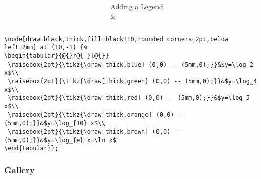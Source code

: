 \documentclass[aspectratio=169,mathserif,8pt,xcolor=table,notes=show]{beamer}
\begin{document}
\begin{frame}[fragile]
\begin{columns}[T]
\begin{column}{.433\textwidth}
				\end{column}
				\begin{column}{.433\textwidth}
					\centering
						\quad\\[.5in]
						{\Huge Adding a Legend}\\[.2in]
						\&\\[.2in]
						\href{http://www.texample.net/tikz/examples/}{}
				\end{column}
			\end{columns}
			\begin{lstlisting}
\node[draw=black,thick,fill=black!10,rounded corners=2pt,below left=2mm] at (10,-1) {%
\begin{tabular}{@{}r@{ }l@{}}
 \raisebox{2pt}{\tikz{\draw[thick,blue] (0,0) -- (5mm,0);}}&$y=\log_2 x$\\
 \raisebox{2pt}{\tikz{\draw[thick,green] (0,0) -- (5mm,0);}}&$y=\log_4 x$\\
 \raisebox{2pt}{\tikz{\draw[thick,red] (0,0) -- (5mm,0);}}&$y=\log_5 x$\\
 \raisebox{2pt}{\tikz{\draw[thick,orange] (0,0) -- (5mm,0);}}&$y=\log_{10} x$\\
 \raisebox{2pt}{\tikz{\draw[thick,brown] (0,0) -- (5mm,0);}}&$y=\log_{e} x=\ln x$
\end{tabular}};
			\end{lstlisting}
		\end{frame}

		\subsubsection{Gallery}

\end{document}
